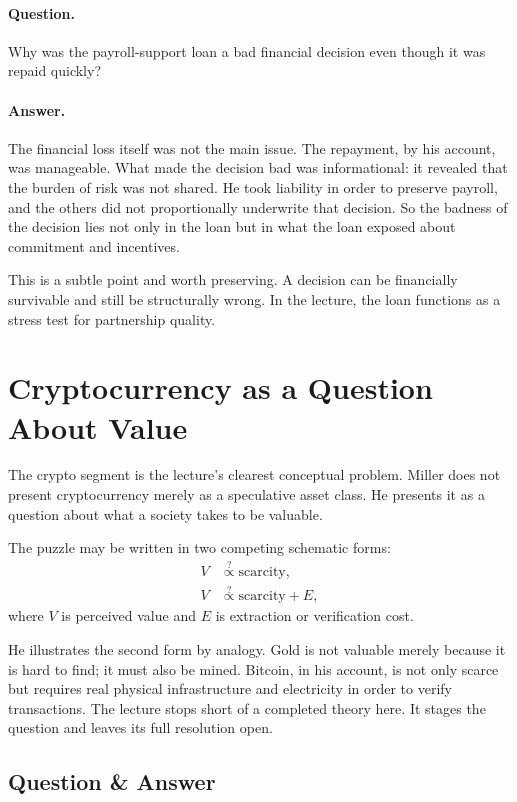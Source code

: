\paragraph{Question.} Why was the payroll-support loan a bad financial decision even though it was repaid quickly?

\paragraph{Answer.} The financial loss itself was not the main issue. The repayment, by his account, was manageable. What made the decision bad was informational: it revealed that the burden of risk was not shared. He took liability in order to preserve payroll, and the others did not proportionally underwrite that decision. So the badness of the decision lies not only in the loan but in what the loan exposed about commitment and incentives.

This is a subtle point and worth preserving. A decision can be financially survivable and still be structurally wrong. In the lecture, the loan functions as a stress test for partnership quality.

\section{Cryptocurrency as a Question About Value}

The crypto segment is the lecture's clearest conceptual problem. Miller does not present cryptocurrency merely as a speculative asset class. He presents it as a question about what a society takes to be valuable.

The puzzle may be written in two competing schematic forms:
\begin{align}
V &\stackrel{?}{\propto} \text{scarcity},\\
V &\stackrel{?}{\propto} \text{scarcity}+E,
\end{align}
where \(V\) is perceived value and \(E\) is extraction or verification cost.

He illustrates the second form by analogy. Gold is not valuable merely because it is hard to find; it must also be mined. Bitcoin, in his account, is not only scarce but requires real physical infrastructure and electricity in order to verify transactions. The lecture stops short of a completed theory here. It stages the question and leaves its full resolution open.

\subsection{Question \& Answer}

